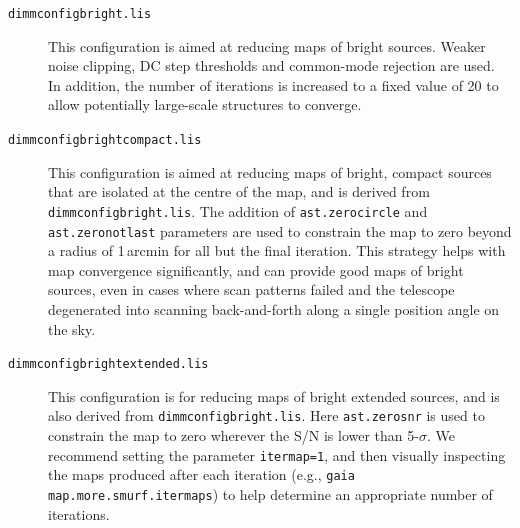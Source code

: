 \documentclass[twoside,11pt]{article}
\renewcommand{\_}{\texttt{\symbol{95}}}
\begin{document}
\begin{description}
\item[\texttt{dimmconfig\_bright.lis}]\quad This configuration is
  aimed at reducing maps of bright sources. Weaker noise clipping, DC
  step thresholds and common-mode rejection are used. In addition, the
  number of iterations is increased to a fixed value of 20 to allow
  potentially large-scale structures to converge.

\item[\texttt{dimmconfig\_bright\_compact.lis}]\quad This
  configuration is aimed at reducing maps of bright, compact sources
  that are isolated at the centre of the map, and is derived from
  \texttt{dimmconfig\_bright.lis}. The addition of
  \texttt{ast.zero\_circle} and \texttt{ast.zero\_notlast} parameters
  are used to constrain the map to zero beyond a radius of 1\,arcmin
  for all but the final iteration. This strategy helps with map
  convergence significantly, and can provide good maps of bright
  sources, even in cases where scan patterns failed and the telescope
  degenerated into scanning back-and-forth along a single position
  angle on the sky.

\item[\texttt{dimmconfig\_bright\_extended.lis}]\quad This
  configuration is for reducing maps of bright extended sources, and
  is also derived from \texttt{dimmconfig\_bright.lis}. Here
  \texttt{ast.zero\_snr} is used to constrain the map to zero wherever
  the S/N is lower than 5-$\sigma$. We recommend setting the parameter
  \texttt{itermap=1}, and then visually inspecting the maps produced
  after each iteration (e.g., \texttt{gaia map.more.smurf.itermaps})
  to help determine an appropriate number of iterations.




\end{description}
\end{document}

